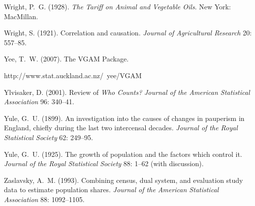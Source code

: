 \smallskip\noindent
Wright, P.~G. (1928).
{\it The Tariff on Animal and Vegetable Oils\/}.
New York: MacMillan.

\smallskip\noindent
Wright, S. (1921).
Correlation and causation.
{\it Journal of
Agricultural Research\/} 20: 557--85.

\smallskip\noindent
Yee, T.~W. (2007).
The VGAM Package.

\noindent\hskip 10pt
http://www.stat.auckland.ac.nz/\string~yee/VGAM

\smallskip\noindent
Ylvisaker, D. (2001).
Review of {\it Who Counts?\/}
{\it Journal of the American Statistical Association\/} 96: 340--41.

\smallskip\noindent
Yule, G.~U. (1899).
An investigation into the causes of changes in pauperism in England,
chiefly during the last two intercensal decades.
{\it Journal of the Royal Statistical Society\/} 62: 249--95.

\smallskip\noindent
Yule, G.~U. (1925).
The growth of population and the factors which control it.
{\it Journal of the Royal Statistical Society\/} {88}: 1--62 (with discussion).

\smallskip\noindent
Zaslavsky, A.~M. (1993).
Combining census, dual system, and evaluation study data to estimate population shares.
{\it Journal of the American Statistical Association\/} 88: 1092--1105.



\bye

